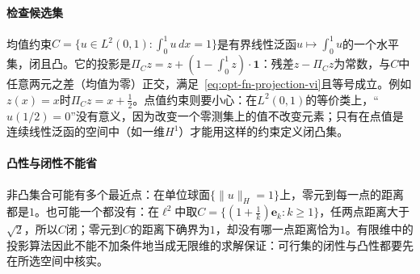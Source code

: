 \paragraph{检查候选集}
均值约束$C=\{u\in L^2(0,1):\int_0^1u\,dx=1\}$是有界线性泛函$u\mapsto\int_0^1u$的一个水平集，闭且凸。它的投影是$\Pi_Cz=z+(1-\int_0^1z)\cdot\mathbf 1$：残差$z-\Pi_Cz$为常数，与$C$中任意两元之差（均值为零）正交，满足~\eqref{eq:opt-fn-projection-vi}且等号成立。例如$z(x)=x$时$\Pi_Cz=x+\frac12$。点值约束则要小心：在$L^2(0,1)$的等价类上，“$u(1/2)=0$”没有意义，因为改变一个零测集上的值不改变元素；只有在点值是连续线性泛函的空间中（如一维$H^1$）才能用这样的约束定义闭凸集。

\paragraph{凸性与闭性不能省}
非凸集合可能有多个最近点：在单位球面$\{\|u\|_H=1\}$上，零元到每一点的距离都是$1$。也可能一个都没有：在$\ell^2$中取$C=\{(1+\frac1k)\bm e_k:k\ge1\}$，任两点距离大于$\sqrt2$，所以$C$闭；零元到$C$的距离下确界为$1$，却没有哪一点距离恰为$1$。有限维中的投影算法因此不能不加条件地当成无限维的求解保证：可行集的闭性与凸性都要先在所选空间中核实。

